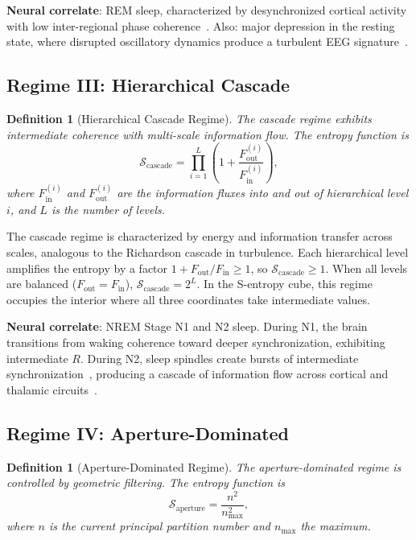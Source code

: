 \documentclass[aps,prd,twocolumn,superscriptaddress,floatfix,nofootinbib]{revtex4-2}
\newtheorem{definition}[theorem]{Definition}
\theoremstyle{remark}
\newcommand{\Rorder}{R}
\newcommand{\Sregime}{\mathcal{S}}
\begin{document}
\textbf{Neural correlate}: REM sleep, characterized by desynchronized cortical activity with low inter-regional phase coherence~\cite{hobson2002cognitive}. Also: major depression in the resting state, where disrupted oscillatory dynamics produce a turbulent EEG signature~\cite{fingelkurts2006altered,uhlhaas2006neural}.

\subsection{Regime III: Hierarchical Cascade}

\begin{definition}[Hierarchical Cascade Regime]
\label{def:cascade}
The cascade regime exhibits intermediate coherence with multi-scale information flow. The entropy function is
\begin{equation}
    \boxed{\Sregime_{\text{cascade}} = \prod_{i=1}^{L} \left(1 + \frac{F_{\text{out}}^{(i)}}{F_{\text{in}}^{(i)}}\right),}
    \label{eq:s_cascade}
\end{equation}
where $F_{\text{in}}^{(i)}$ and $F_{\text{out}}^{(i)}$ are the information fluxes into and out of hierarchical level $i$, and $L$ is the number of levels.
\end{definition}

The cascade regime is characterized by energy and information transfer across scales, analogous to the Richardson cascade in turbulence. Each hierarchical level amplifies the entropy by a factor $1 + F_{\text{out}}/F_{\text{in}} \geq 1$, so $\Sregime_{\text{cascade}} \geq 1$. When all levels are balanced ($F_{\text{out}} = F_{\text{in}}$), $\Sregime_{\text{cascade}} = 2^L$. In the S-entropy cube, this regime occupies the interior where all three coordinates take intermediate values.

\textbf{Neural correlate}: NREM Stage N1 and N2 sleep. During N1, the brain transitions from waking coherence toward deeper synchronization, exhibiting intermediate $\Rorder$. During N2, sleep spindles create bursts of intermediate synchronization~\cite{steriade2006grouping,dangvu2014eeg}, producing a cascade of information flow across cortical and thalamic circuits~\cite{diekelmann2010memory}.

\subsection{Regime IV: Aperture-Dominated}

\begin{definition}[Aperture-Dominated Regime]
\label{def:aperture}
The aperture-dominated regime is controlled by geometric filtering. The entropy function is
\begin{equation}
    \boxed{\Sregime_{\text{aperture}} = \frac{n^2}{n_{\max}^2},}
    \label{eq:s_aperture}
\end{equation}
where $n$ is the current principal partition number and $n_{\max}$ the maximum.
\end{definition}
\end{document}
